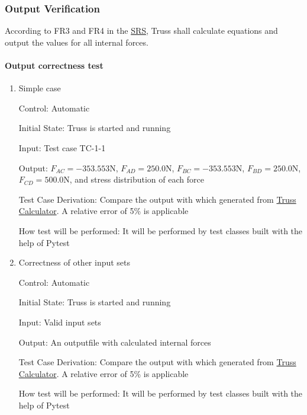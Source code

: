 \documentclass[12pt, titlepage]{article}
\begin{document}
\subsubsection{Output Verification} \label{outverify}
According to FR3 and FR4 in the 
\href{https://github.com/tingyuw/cas741/blob/master/docs/SRS/SRS.pdf}{SRS}, 
Truss shall calculate equations and output the values for all internal forces. 

\paragraph{Output correctness test}

\begin{enumerate}
	
	\item{Simple case\\}
	
	Control: Automatic
	
	Initial State: Truss is started and running
	
	Input: Test case TC-1-1
	
	Output: $F_{AC} = -353.553 \si{\newton}$, $F_{AD} = 250.0 \si{\newton}$, 
	$F_{BC} = -353.553 \si{\newton}$, $F_{BD} = 250.0 \si{\newton}$, $F_{CD} = 
	500.0 \si{\newton}$, and stress distribution of each force
	
	Test Case Derivation: Compare the output with which generated from
	\href{https://skyciv.com/free-truss-calculator/}{Truss Calculator}. A 
	relative error of 5\% is applicable
	
	How test will be performed: It will be performed by test classes built with 
	the help of Pytest
	
	\item{Correctness of other input sets\\}
	
	Control: Automatic
	
	Initial State: Truss is started and running
	
	Input: Valid input sets
	
	Output: An outputfile with calculated internal forces
	
	Test Case Derivation: Compare the output with which generated from
	\href{https://skyciv.com/free-truss-calculator/}{Truss Calculator}. A 
	relative error of 5\% is applicable
	
	How test will be performed: It will be performed by test classes built with 
	the help of Pytest
\end{enumerate}
\end{document}
